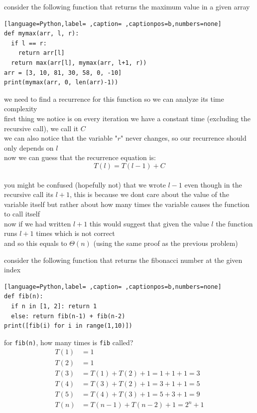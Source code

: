 \documentclass[a4paper,12pt]{article}
\begin{document}
\begin{my_example}
consider the following function that returns the maximum value in a given array\\[0pt]
\begin{lstlisting}[language=Python,label= ,caption= ,captionpos=b,numbers=none]
def mymax(arr, l, r):
  if l == r:
    return arr[l]
  return max(arr[l], mymax(arr, l+1, r))
arr = [3, 10, 81, 30, 58, 0, -10]
print(mymax(arr, 0, len(arr)-1))
\end{lstlisting}
we need to find a recurrence for this function so we can analyze its time complexity\\[0pt]
first thing we notice is on every iteration we have a constant time (excluding the recursive call), we call it \(C\)\\[0pt]
we can also notice that the variable "\(r\)" never changes, so our recurrence should only depends on \(l\)\\[0pt]
now we can guess that the recurrence equation is:\\[0pt]
\[ T(l) = T(l-1) + C \]\\[0pt]
you might be confused (hopefully not) that we wrote \(l-1\) even though in the recursive call its \(l+1\), this is because we dont care about the value of the variable itself but rather about how many times the variable causes the function to call itself\\[0pt]
now if we had written \(l+1\) this would suggest that given the value \(l\) the function runs \(l+1\) times which is not correct\\[0pt]
and so this equals to \(\Theta(n)\) (using the same proof as the previous problem)\\[0pt]
\end{my_example}
\begin{my_example}
consider the following function that returns the fibonacci number at the given index\\[0pt]
\begin{lstlisting}[language=Python,label= ,caption= ,captionpos=b,numbers=none]
def fib(n):
  if n in [1, 2]: return 1
  else: return fib(n-1) + fib(n-2)
print([fib(i) for i in range(1,10)])
\end{lstlisting}
for \texttt{fib(n)}, how many times is \texttt{fib} called?\\[0pt]
\begin{align*}
  T(1) &= 1\\
  T(2) &= 1\\
  T(3) &= T(1) + T(2) + 1 = 1 + 1 + 1 = 3\\
  T(4) &= T(3) + T(2) + 1 = 3 + 1 + 1 = 5\\
  T(5) &= T(4) + T(3) + 1 = 5 + 3 + 1 = 9\\
  T(n) &= T(n-1) + T(n-2) + 1 = 2^n + 1
\end{align*}
\end{my_example}
\end{document}
